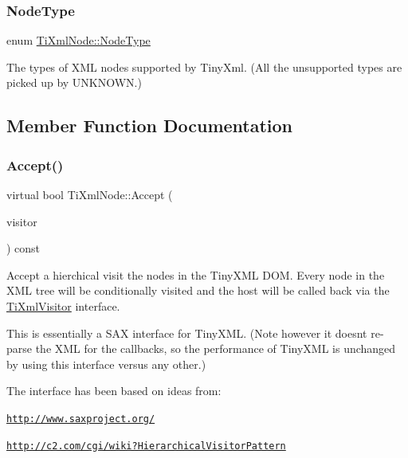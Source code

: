 \subsubsection{\texorpdfstring{Node\+Type}{NodeType}}
{\footnotesize\ttfamily enum \hyperlink{class_ti_xml_node_a836eded4920ab9e9ef28496f48cd95a2}{Ti\+Xml\+Node\+::\+Node\+Type}}

The types of X\+ML nodes supported by Tiny\+Xml. (All the unsupported types are picked up by U\+N\+K\+N\+O\+WN.) 

\subsection{Member Function Documentation}
\hypertarget{class_ti_xml_node_acc0f88b7462c6cb73809d410a4f5bb86}{}\label{class_ti_xml_node_acc0f88b7462c6cb73809d410a4f5bb86} 
\subsubsection{\texorpdfstring{Accept()}{Accept()}}
{\footnotesize\ttfamily virtual bool Ti\+Xml\+Node\+::\+Accept (\begin{DoxyParamCaption}\item[{\hyperlink{class_ti_xml_visitor}{Ti\+Xml\+Visitor} $\ast$}]{visitor }\end{DoxyParamCaption}) const\hspace{0.3cm}{\ttfamily [pure virtual]}}

Accept a hierchical visit the nodes in the Tiny\+X\+ML D\+OM. Every node in the X\+ML tree will be conditionally visited and the host will be called back via the \hyperlink{class_ti_xml_visitor}{Ti\+Xml\+Visitor} interface.

This is essentially a S\+AX interface for Tiny\+X\+ML. (Note however it doesn\textquotesingle{}t re-\/parse the X\+ML for the callbacks, so the performance of Tiny\+X\+ML is unchanged by using this interface versus any other.)

The interface has been based on ideas from\+:


\begin{DoxyItemize}
\item \href{http://www.saxproject.org/}{\tt http\+://www.\+saxproject.\+org/}
\item \href{http://c2.com/cgi/wiki?HierarchicalVisitorPattern}{\tt http\+://c2.\+com/cgi/wiki?\+Hierarchical\+Visitor\+Pattern}
\end{DoxyItemize}

